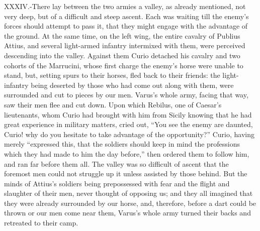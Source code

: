 XXXIV.-There lay between the two armies a valley, as already mentioned,
not very deep, but of a difficult and steep ascent. Each was waiting
till the enemy's forces should attempt to pass it, that they might
engage with the advantage of the ground. At the same time, on the left
wing, the entire cavalry of Publius Attius, and several light-armed
infantry intermixed with them, were perceived descending into the
valley. Against them Curio detached his cavalry and two cohorts of the
Marrucini, whose first charge the enemy's horse were unable to stand,
but, setting spurs to their horses, fled back to their friends: the
light-infantry being deserted by those who had come out along with them,
were surrounded and cut to pieces by our men. Varus's whole army, facing
that way, saw their men flee and cut down. Upon which Rebilus, one of
Caesar's lieutenants, whom Curio had brought with him from Sicily
knowing that he had great experience in military matters, cried out,
``You see the enemy are daunted, Curio! why do you hesitate to take
advantage of the opportunity?'' Curio, having merely ``expressed this,
that the soldiers should keep in mind the professions which they had
made to him the day before,'' then ordered them to follow him, and ran
far before them all. The valley was so difficult of ascent that the
foremost men could not struggle up it unless assisted by those behind.
But the minds of Attius's soldiers being prepossessed with fear and the
flight and slaughter of their men, never thought of opposing us; and
they all imagined that they were already surrounded by our horse, and,
therefore, before a dart could be thrown or our men come near them,
Varus's whole army turned their backs and retreated to their camp.

